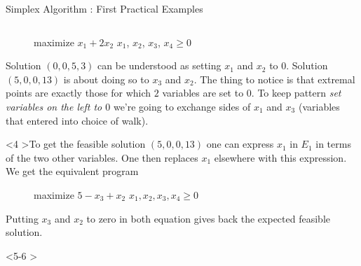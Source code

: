 \documentclass[aspectratio = 169]{beamer}
\begin{document}
\begin{frame}{Simplex Algorithm : First Practical Examples}
\begin{columns}
\begin{column}{.5\textwidth}
\begin{onlyenv}
\begin{figure}
{\begin{linearProg}{
                      maximize
                    }{
                      $x_1 + 2x_2$
                    }{
                    }{
                      $x_1$, $x_2$, $x_3$, $x_4 \geq 0$
                    }
                  \end{linearProg}
                }
              \end{figure}
              Solution $(0, 0, 5, 3)$ can be understood as setting
              $x_1$ and $x_2$ to $0$. Solution $(5, 0, 0, 13)$ is
              about doing so to $x_3$ and $x_2$. \pause The thing to
              notice is that extremal points are exactly those for
              which $2$ variables are set to $0$. \pause To keep
              pattern \textit{set variables on the left to $0$} we're
              going to exchange sides of $x_1$ and $x_3$ (variables
              that entered into choice of walk).
            \end{onlyenv}
            \begin{onlyenv}<4
              >To get the feasible solution $(5, 0, 0, 13)$ one can
              express $x_1$ in $E_1$ in terms of the two other
              variables. One then replaces $x_1$ elsewhere with this
              expression. We get the equivalent program
                \begin{figure}
                  \small{
                    \begin{linearProg}{
                        maximize
                      }{
                        $5 - x_3 + x_2$
                      }{
                      }{
                        $x_1, x_2, x_3, x_4 \geq 0$
                      }
                    \end{linearProg}
                  }
                \end{figure}
                Putting $x_3$ and $x_2$ to zero in both equation gives
                back the expected feasible solution.
            \end{onlyenv}
            \begin{onlyenv}<5-6
                >
\end{onlyenv}
\end{column}
\end{columns}
\end{frame}
\end{document}

